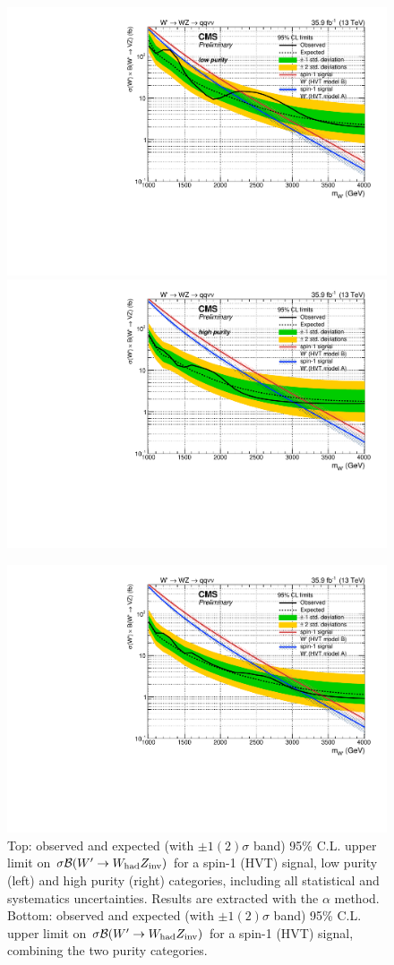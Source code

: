 \begin{figure}[!htb]
  \begin{center}
     \includegraphics[width=.495\textwidth]{v9/plotsAlpha/Limits/Exclusion_XWZInv_XVZnnlp_asymptotic.pdf}%
     \includegraphics[width=.495\textwidth]{v9/plotsAlpha/Limits/Exclusion_XWZInv_XVZnnhp_asymptotic.pdf}

     \includegraphics[width=.495\textwidth]{v9/plotsAlpha/Limits/Exclusion_XWZInv_XVZnn_asymptotic.pdf}
  \end{center}
  \caption{Top: observed and expected (with $\pm1(2)\sigma$ band) 95\% C.L. upper limit on $\sigma \mathcal{B} (W' \rightarrow W_{\text{had}} Z_{\text{inv}})$ for a spin-1 (HVT) signal, low purity (left) and high purity (right) categories, including all statistical and systematics uncertainties. Results are extracted with the $\alpha$ method. Bottom: observed and expected (with $\pm1(2)\sigma$ band) 95\% C.L. upper limit on $\sigma \mathcal{B} (W' \rightarrow W_{\text{had}} Z_{\text{inv}})$ for a spin-1 (HVT) signal, combining the two purity categories.}
  \label{fig:Limit_XWZInv}
\end{figure}

